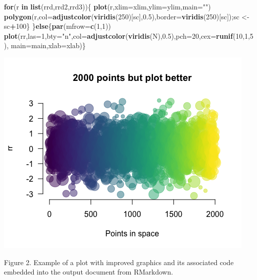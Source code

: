 \documentclass[article]{article}
\newenvironment{Shaded}{\begin{snugshade}}{\end{snugshade}}
\newcommand{\KeywordTok}[1]{\textcolor[rgb]{0.13,0.29,0.53}{\textbf{#1}}}
\newcommand{\DataTypeTok}[1]{\textcolor[rgb]{0.13,0.29,0.53}{#1}}
\newcommand{\DecValTok}[1]{\textcolor[rgb]{0.00,0.00,0.81}{#1}}
\newcommand{\FloatTok}[1]{\textcolor[rgb]{0.00,0.00,0.81}{#1}}
\newcommand{\StringTok}[1]{\textcolor[rgb]{0.31,0.60,0.02}{#1}}
\newcommand{\ControlFlowTok}[1]{\textcolor[rgb]{0.13,0.29,0.53}{\textbf{#1}}}
\newcommand{\OperatorTok}[1]{\textcolor[rgb]{0.81,0.36,0.00}{\textbf{#1}}}
\newcommand{\NormalTok}[1]{#1}
\begin{document}
\begin{Shaded}
\begin{Highlighting}[]
\ControlFlowTok{for}\NormalTok{(r }\ControlFlowTok{in} \KeywordTok{list}\NormalTok{(rrd,rrd2,rrd3))\{}
  \KeywordTok{plot}\NormalTok{(r,}\DataTypeTok{xlim=}\NormalTok{xlim,}\DataTypeTok{ylim=}\NormalTok{ylim,}\DataTypeTok{main=}\StringTok{""}\NormalTok{)}
  \KeywordTok{polygon}\NormalTok{(r,}\DataTypeTok{col=}\KeywordTok{adjustcolor}\NormalTok{(}\KeywordTok{viridis}\NormalTok{(}\DecValTok{250}\NormalTok{)[sc],}\FloatTok{0.5}\NormalTok{),}\DataTypeTok{border=}\KeywordTok{viridis}\NormalTok{(}\DecValTok{250}\NormalTok{)[sc]);sc <-}\StringTok{ }\NormalTok{sc}\OperatorTok{+}\DecValTok{100}\NormalTok{\}}
\NormalTok{\}}\ControlFlowTok{else}\NormalTok{\{}\KeywordTok{par}\NormalTok{(}\DataTypeTok{mfrow=}\KeywordTok{c}\NormalTok{(}\DecValTok{1}\NormalTok{,}\DecValTok{1}\NormalTok{))}
  \KeywordTok{plot}\NormalTok{(rr,}\DataTypeTok{las=}\DecValTok{1}\NormalTok{,}\DataTypeTok{bty=}\StringTok{"n"}\NormalTok{,}\DataTypeTok{col=}\KeywordTok{adjustcolor}\NormalTok{(}\KeywordTok{viridis}\NormalTok{(N),}\FloatTok{0.5}\NormalTok{),}\DataTypeTok{pch=}\DecValTok{20}\NormalTok{,}\DataTypeTok{cex=}\KeywordTok{runif}\NormalTok{(}\DecValTok{10}\NormalTok{,}\DecValTok{1}\NormalTok{,}\DecValTok{5}\NormalTok{),}
       \DataTypeTok{main=}\NormalTok{main,}\DataTypeTok{xlab=}\NormalTok{xlab)\}}
\end{Highlighting}
\end{Shaded}

\includegraphics{Lesson5_rmd_files/figure-docx/unnamed-chunk-3-1.png}

Figure 2. Example of a plot with improved graphics and its associated
code embedded into the output document from RMarkdown.
\end{document}
